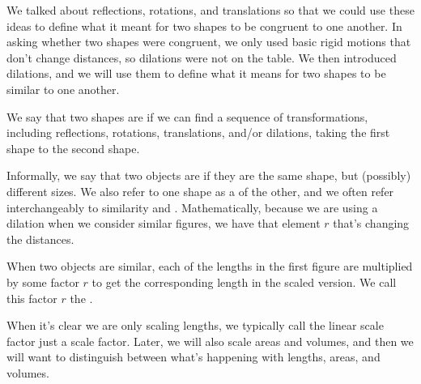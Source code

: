 \documentclass{ximera}
\begin{document}
We talked about reflections, rotations, and translations so that we could use these ideas to define what it meant for two shapes to be congruent to one another. In asking whether two shapes were congruent, we only used basic rigid motions that don't change distances, so dilations were not on the table. We then introduced dilations, and we will use them to define what it means for two shapes to be similar to one another.
\begin{definition}
We say that two shapes are  if we can find a sequence of transformations, including reflections, rotations, translations, and/or dilations, taking the first shape to the second shape.
\end{definition}
Informally, we say that two objects are  if they are the same shape, but (possibly) different sizes. We also refer to one shape as a  of the other, and we often refer interchangeably to similarity and . Mathematically, because we are using a dilation when we consider similar figures, we have that element $r$ that's changing the distances.
\begin{definition}
When two objects are similar, each of the lengths in the first figure are multiplied by some factor $r$ to get the corresponding length in the scaled version. We call this factor $r$ the .
\end{definition}
When it's clear we are only scaling lengths, we typically call the linear scale factor just a scale factor. Later, we will also scale areas and volumes, and then we will want to distinguish between what's happening with lengths, areas, and volumes.
\end{document}
